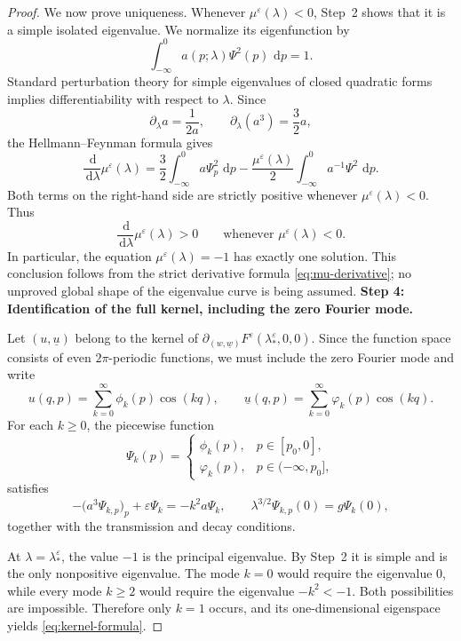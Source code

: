 \documentclass[11pt,reqno]{amsart}
\numberwithin{equation}{section}
\newcommand{\dd}{\,\mathrm{d}}
\theoremstyle{definition}
\theoremstyle{remark}
\begin{document}
\begin{proof}
We now prove uniqueness.  Whenever $\mu^\varepsilon(\lambda)<0$, Step~2
shows that it is a simple isolated eigenvalue.  We normalize its
eigenfunction by
\[
\int_{-\infty}^{0}a(p;\lambda)\Psi^2(p)\,\dd p=1.
\]
Standard perturbation theory for simple eigenvalues of closed
quadratic forms implies differentiability with respect to $\lambda$.
Since
\[
\partial_\lambda a=\frac1{2a},
\qquad
\partial_\lambda(a^3)=\frac32a,
\]
the Hellmann--Feynman formula gives
\begin{equation}
\label{eq:mu-derivative}
\frac{\dd}{\dd\lambda}\mu^\varepsilon(\lambda)
=
\frac32
\int_{-\infty}^{0}a\Psi_p^2\,\dd p
-
\frac{\mu^\varepsilon(\lambda)}2
\int_{-\infty}^{0}a^{-1}\Psi^2\,\dd p.
\end{equation}
Both terms on the right-hand side are strictly positive whenever
$\mu^\varepsilon(\lambda)<0$.  Thus
\[
\frac{\dd}{\dd\lambda}\mu^\varepsilon(\lambda)>0
\qquad\text{whenever }\mu^\varepsilon(\lambda)<0.
\]
In particular, the equation
$\mu^\varepsilon(\lambda)=-1$ has exactly one solution.  This
conclusion follows from the strict derivative formula
\eqref{eq:mu-derivative}; no unproved global shape of the eigenvalue
curve is being assumed.
\medskip
\noindent
\textbf{Step 4: Identification of the full kernel, including the
zero Fourier mode.}

Let $(u,\underline u)$ belong to the kernel of
$\partial_{(w,\underline w)}F^\varepsilon(\lambda_*^\varepsilon,0,0)$.  Since the
function space consists of even $2\pi$-periodic functions, we must
include the zero Fourier mode and write
\[
u(q,p)=\sum_{k=0}^{\infty}\phi_k(p)\cos(kq),
\qquad
\underline u(q,p)
=
\sum_{k=0}^{\infty}\varphi_k(p)\cos(kq).
\]
For each $k\geq0$, the piecewise function
\[
\Psi_k(p)
=
\begin{cases}
\phi_k(p),&p\in[p_0,0],\\
\varphi_k(p),&p\in(-\infty,p_0],
\end{cases}
\]
satisfies
\begin{equation}
\label{eq:k-mode}
-\bigl(a^3\Psi_{k,p}\bigr)_p+\varepsilon\Psi_k
=
-k^2a\Psi_k,
\qquad
\lambda^{3/2}\Psi_{k,p}(0)=g\Psi_k(0),
\end{equation}
together with the transmission and decay conditions.

At $\lambda=\lambda_*^\varepsilon$, the value $-1$ is the principal
eigenvalue.  By Step~2 it is simple and is the only nonpositive
eigenvalue.  The mode $k=0$ would require the eigenvalue $0$, while
every mode $k\geq2$ would require the eigenvalue
$-k^2<-1$.  Both possibilities are impossible.  Therefore only
$k=1$ occurs, and its one-dimensional eigenspace yields
\eqref{eq:kernel-formula}.


\end{proof}
\end{document}
